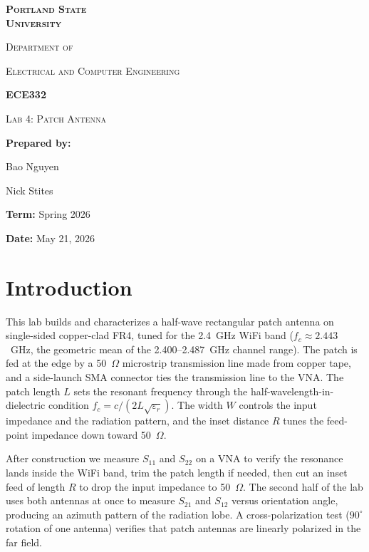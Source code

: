 \documentclass[11pt,letterpaper]{article}
\begin{document}
\begin{titlepage}
\centering
\vspace*{2cm}
{\Huge\bfseries\scshape Portland State \\[2pt] University \par}
\vspace{1.5cm}
{\large\scshape Department of \par}
{\large\scshape Electrical and Computer Engineering \par}
\vspace{1.5cm}
{\LARGE\bfseries ECE332 \par}
\vspace{0.4cm}
{\LARGE\scshape Lab 4: Patch Antenna \par}
\vfill
{\large \textbf{Prepared by:} \par}
{\large Bao Nguyen \par}
{\large Nick Stites \par}
\vspace{1cm}
{\large \textbf{Term:} Spring 2026 \par}
\vspace{0.4cm}
{\large \textbf{Date:} May 21, 2026 \par}
\vspace{2cm}
\end{titlepage}

\thispagestyle{empty}
\tableofcontents
\newpage

\section{Introduction}

This lab builds and characterizes a half-wave rectangular patch antenna on single-sided copper-clad FR4, tuned for the 2.4~GHz WiFi band ($f_c \approx 2.443$~GHz, the geometric mean of the 2.400--2.487~GHz channel range). The patch is fed at the edge by a 50~$\Omega$ microstrip transmission line made from copper tape, and a side-launch SMA connector ties the transmission line to the VNA. The patch length $L$ sets the resonant frequency through the half-wavelength-in-dielectric condition $f_c = c/(2L\sqrt{\varepsilon_r})$. The width $W$ controls the input impedance and the radiation pattern, and the inset distance $R$ tunes the feed-point impedance down toward 50~$\Omega$.

After construction we measure $S_{11}$ and $S_{22}$ on a VNA to verify the resonance lands inside the WiFi band, trim the patch length if needed, then cut an inset feed of length $R$ to drop the input impedance to 50~$\Omega$. The second half of the lab uses both antennas at once to measure $S_{21}$ and $S_{12}$ versus orientation angle, producing an azimuth pattern of the radiation lobe. A cross-polarization test ($90^\circ$ rotation of one antenna) verifies that patch antennas are linearly polarized in the far field.
\end{document}
